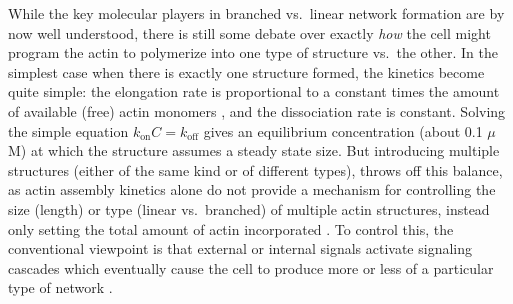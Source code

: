 \documentclass[11pt]{article}
\begin{document}
While the key molecular players in branched vs.\ linear network formation are by now well understood, there is still some debate over exactly \emph{how} the cell might program the actin to polymerize into one type of structure vs.\ the other. In the simplest case when there is exactly one structure formed, the kinetics become quite simple: the elongation rate is proportional to a constant times the amount of available (free) actin monomers \cite{suarez2016internetwork}, and the dissociation rate is constant. Solving the simple equation $k_\text{on} C=k_\text{off}$ gives an equilibrium concentration (about 0.1 $\mu$M) at which the structure assumes a steady state size. But introducing multiple structures (either of the same kind or of different types), throws off this balance, as actin assembly kinetics alone do not provide a mechanism for controlling the size (length) or type (linear vs.\ branched) of multiple actin structures, instead only setting the total amount of actin incorporated \cite{mohapatra2017limiting}. To control this, the conventional viewpoint is that external or internal signals \cite{carlier2017global} activate signaling cascades which eventually cause the cell to produce more or less of a particular type of network \cite{martin2005tea4p, pollard2007regulation, suarez2016internetwork}.

\end{document}

